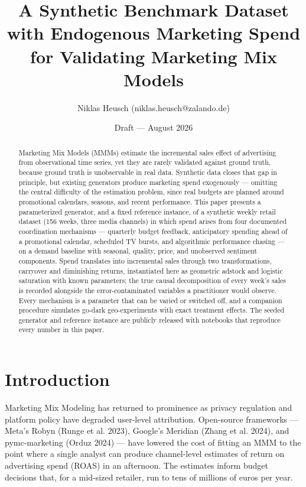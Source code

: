 \documentclass[
  conference]{IEEEtran}
\title{A Synthetic Benchmark Dataset with Endogenous Marketing Spend for
Validating Marketing Mix Models}
\author{Niklas Heusch (niklas.heusch@zalando.de)}
\date{Draft --- August 2026}
\begin{document}
\maketitle
\begin{abstract}
Marketing Mix Models (MMMs) estimate the incremental sales effect of
advertising from observational time series, yet they are rarely
validated against ground truth, because ground truth is unobservable in
real data. Synthetic data closes that gap in principle, but existing
generators produce marketing spend exogenously --- omitting the central
difficulty of the estimation problem, since real budgets are planned
around promotional calendars, seasons, and recent performance. This
paper presents a parameterized generator, and a fixed reference
instance, of a synthetic weekly retail dataset (156 weeks, three media
channels) in which spend arises from four documented coordination
mechanisms --- quarterly budget feedback, anticipatory spending ahead of
a promotional calendar, scheduled TV bursts, and algorithmic performance
chasing --- on a demand baseline with seasonal, quality, price, and
unobserved sentiment components. Spend translates into incremental sales
through two transformations, carryover and diminishing returns,
instantiated here as geometric adstock and logistic saturation with
known parameters; the true causal decomposition of every week's sales is
recorded alongside the error-contaminated variables a practitioner would
observe. Every mechanism is a parameter that can be varied or switched
off, and a companion procedure simulates go-dark geo-experiments with
exact treatment effects. The seeded generator and reference instance are
publicly released with notebooks that reproduce every number in this
paper.
\end{abstract}

\section{Introduction}\label{introduction}

Marketing Mix Modeling has returned to prominence as privacy regulation
and platform policy have degraded user-level attribution. Open-source
frameworks --- Meta's Robyn (Runge et al. 2023), Google's Meridian
(Zhang et al. 2024), and pymc-marketing (Orduz 2024) --- have lowered
the cost of fitting an MMM to the point where a single analyst can
produce channel-level estimates of return on advertising spend (ROAS) in
an afternoon. The estimates inform budget decisions that, for a
mid-sized retailer, run to tens of millions of euros per year.
\end{document}
